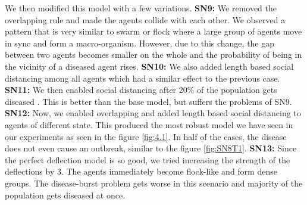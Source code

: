 \documentclass[a4paper,11pt]{article}
\begin{document}
    We then modified this model with a few variations. {\bf SN9:} We removed the overlapping rule and made the agents collide with each other. We observed a pattern that is very similar to swarm or flock where a large group of agents move in sync and form a macro-organism. However, due to this change, the gap between two agents becomes smaller on the whole and the probability of being in the vicinity of a diseased agent rises. {\bf SN10:} We also added length based social distancing among all agents which had a similar effect to the previous case. {\bf SN11:} We then enabled social distancing after 20\% of the population gets diseased \cite{3b1b}. This is better than the base model, but suffers the problems of SN9. {\bf SN12:} Now, we enabled overlapping and added length based social distancing to agents of different state. This produced the most robust model we have seen in our experiments as seen in the figure \ref{fig:4.1}. In half of the cases, the disease does not even cause an outbreak, similar to the figure \ref{fig:SN8T1}. {\bf SN13:} Since the perfect deflection model is so good, we tried increasing the strength of the deflections by 3. The agents immediately become flock-like and form dense groups. The disease-burst problem gets worse in this scenario and majority of the population gets diseased at once.
\end{document}
